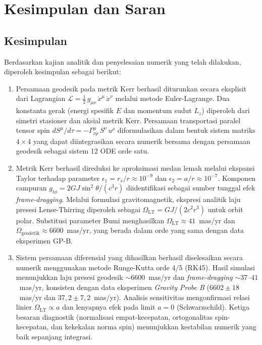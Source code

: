
\chapter{Kesimpulan dan Saran}
\label{chap:kesimpulan}


\section{Kesimpulan}
\label{sec:kesimpulan}

Berdasarkan kajian analitik dan penyelesaian numerik yang telah dilakukan,
diperoleh kesimpulan sebagai berikut:

\begin{enumerate}
    \item Persamaan geodesik pada metrik Kerr berhasil diturunkan
          secara eksplisit dari Lagrangian
          $\mathcal{L} = \frac{1}{2}\,g_{\mu\nu}\,\dot{x}^\mu\,\dot{x}^\nu$
          melalui metode Euler-Lagrange.
          Dua konstanta gerak (energi spesifik $E$ dan momentum sudut $L_z$)
          diperoleh dari simetri stasioner dan aksial metrik Kerr.
          Persamaan transportasi paralel tensor spin
          $dS^\mu/d\tau = -\Gamma^\mu_{\nu\rho}\, S^\nu\, u^\rho$
          diformulasikan dalam bentuk sistem matriks $4 \times 4$
          yang dapat diintegrasikan secara numerik bersama dengan
          persamaan geodesik sebagai sistem 12 ODE orde satu.

    \item Metrik Kerr berhasil direduksi ke aproksimasi medan lemah
          melalui ekspansi Taylor terhadap parameter
          $\epsilon_1 = r_s/r \approx 10^{-9}$ dan $\epsilon_2 = a/r \approx 10^{-7}$.
          Komponen campuran $g_{t\phi} = 2GJ\sin^2\!\theta/(c^3 r)$
          diidentifikasi sebagai sumber tunggal efek \textit{frame-dragging}.
          Melalui formulasi gravitomagnetik, ekspresi analitik
          laju presesi Lense-Thirring diperoleh sebagai
          $\Omega_{\text{LT}} = GJ/(2c^2 r^3)$
          untuk orbit polar.
          Substitusi parameter Bumi menghasilkan
          $\Omega_{\text{LT}} \approx 41$~mas/yr
          dan $\Omega_{\text{geodetik}} \approx 6600$~mas/yr,
          yang berada dalam orde yang sama dengan data eksperimen GP-B.

    \item Sistem persamaan diferensial yang dihasilkan
          berhasil diselesaikan secara numerik menggunakan
          metode Runge-Kutta orde 4/5 (RK45).
          Hasil simulasi menunjukkan laju presesi geodesik $\sim 6600$~mas/yr
          dan \textit{frame-dragging} $\sim 37$--$41$~mas/yr,
          konsisten dengan data eksperimen \textit{Gravity Probe B}
          ($6602 \pm 18$~mas/yr dan $37{,}2 \pm 7{,}2$~mas/yr).
          Analisis sensitivitas mengonfirmasi relasi linier
          $\Omega_{\text{LT}} \propto a$
          dan lenyapnya efek pada limit $a = 0$ (Schwarzschild).
          Ketiga besaran diagnostik (normalisasi empat-kecepatan,
          ortogonalitas spin-kecepatan, dan kekekalan norma spin)
          menunjukkan kestabilan numerik yang baik sepanjang integrasi.
\end{enumerate}

